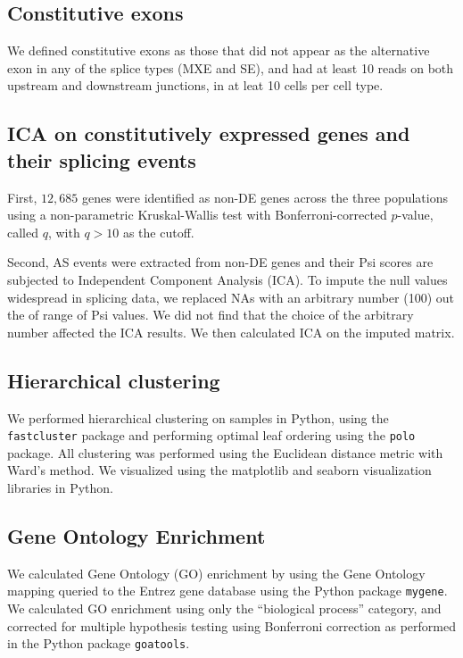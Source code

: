 \subsection{Constitutive exons}

We defined constitutive exons as those that did not appear as the alternative exon in any of the splice types (MXE and SE), and had at least 10 reads on both upstream and downstream junctions, in at leat 10 cells per cell type.

\subsection{ICA on constitutively expressed genes and their splicing events}
First, $12,685$ genes were identified as non-DE genes across the three populations using a non-parametric Kruskal-Wallis test with Bonferroni-corrected $p$-value, called $q$, with $q > 10$ as the cutoff.

Second, AS events were extracted from non-DE genes and their Psi scores are subjected to Independent Component Analysis (ICA). To impute the null values widespread in splicing data, we replaced NAs with an arbitrary number (100) out the of range of Psi values. We did not find that the choice of the arbitrary number affected the ICA results. We then calculated ICA on the imputed matrix.

\subsection{Hierarchical clustering}

We performed hierarchical clustering on samples in Python, using the \texttt{fastcluster}\cite{Mullner:2013bl} package and performing optimal leaf ordering\cite{BarJoseph:2001tr} using the \texttt{polo}\cite{Anonymous:2FB4UNR9} package. All clustering was performed using the Euclidean distance metric with Ward's method\cite{WardJr:2012te}. We visualized using the matplotlib\cite{Anonymous:matplotlib} and seaborn\cite{Anonymous:hWlQiCz3} visualization libraries in Python.

\subsection{Gene Ontology Enrichment}
We calculated Gene Ontology (GO) enrichment by using the Gene Ontology mapping queried to the Entrez gene database using the Python package \texttt{mygene}\cite{Wu:2012bo,Xin:2016fv}. We calculated GO enrichment using only the ``biological process'' category, and corrected for multiple hypothesis testing using Bonferroni correction as performed in the Python package \texttt{goatools}\cite{Tang:2015ub}.

